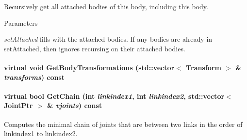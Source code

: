 Recursively get all attached bodies of this body, including this body. 


\begin{DoxyParams}{Parameters}
\item[{\em setAttached}]fills with the attached bodies. If any bodies are already in setAttached, then ignores recursing on their attached bodies. \end{DoxyParams}
\hypertarget{classOpenRAVE_1_1KinBody_a57e27364677e4ade3f7bf0865e7313df}{
\paragraph[{GetBodyTransformations}]{\setlength{\rightskip}{0pt plus 5cm}virtual void GetBodyTransformations (std::vector$<$ Transform $>$ \& {\em transforms}) const}\hfill}
\label{classOpenRAVE_1_1KinBody_a57e27364677e4ade3f7bf0865e7313df}
\hypertarget{classOpenRAVE_1_1KinBody_a81d58139430e2200f75c1bbba99c6a74}{
\paragraph[{GetChain}]{\setlength{\rightskip}{0pt plus 5cm}virtual bool GetChain (int {\em linkindex1}, \/  int {\em linkindex2}, \/  std::vector$<$ JointPtr $>$ \& {\em vjoints}) const}\hfill}
\label{classOpenRAVE_1_1KinBody_a81d58139430e2200f75c1bbba99c6a74}


Computes the minimal chain of joints that are between two links in the order of linkindex1 to linkindex2. 

